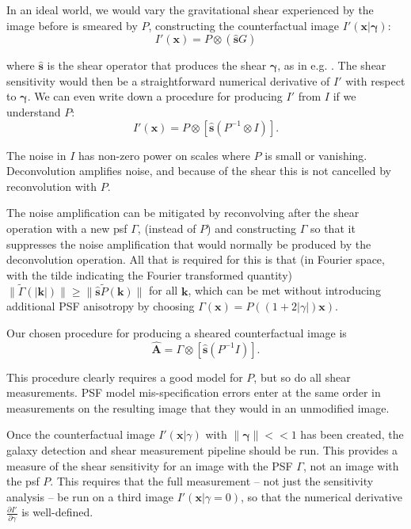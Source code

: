 \documentclass[iop]{emulateapj}
\begin{document}
In an ideal world, we would vary the gravitational shear experienced by the image before is smeared by $P$, constructing the counterfactual image $I'(\mathbf{x}| {\boldsymbol \gamma})$:
\begin{equation}
  I'({\mathbf{x}}) = P \otimes\left( \hat{\mathbf{s}}G\right)
\end{equation}

where $\hat{\mathbf{s}}$ is the shear operator that produces the shear ${\boldsymbol \gamma}$, as in e.g. \cite{2002AJ....123..583B}. The shear sensitivity would then be a straightforward numerical derivative of $I'$ with respect to ${\boldsymbol \gamma}$. We can even write down a procedure for producing $I'$ from $I$ if we understand $P$:
\begin{equation}
  I'({\mathbf{x}}) = P \otimes \left[ \hat{\mathbf{s}}\left( P^{-1} \otimes I \right)\right].
\end{equation}

The noise in $I$ has non-zero power on scales where $P$ is small or vanishing. Deconvolution amplifies noise, and because of the shear this is not cancelled by reconvolution with $P$. 

The noise amplification can be mitigated by reconvolving after the shear operation with a new psf $\Gamma$, (instead of $P$) and constructing $\Gamma$ so that it suppresses the noise amplification that would normally be produced by the deconvolution operation. All that is required for this is that (in Fourier space, with the tilde indicating the Fourier transformed quantity) $\|\tilde{\Gamma}(\mathbf{|k|}) \| \geq \|\hat{\mathbf{s}} \tilde{P}(\mathbf{k})\|$ for all $\mathbf{k}$, which can be met without introducing additional PSF anisotropy by choosing $\Gamma(\mathbf{x}) = P\left((1+2|\gamma|)\mathbf{x}\right)$.

Our chosen procedure for producing a sheared counterfactual image is
\begin{equation}
\hat{\mathbf{A}}  = \Gamma \otimes \left[ \hat{\mathbf{s}} \left(P^{-1} I \right)\right].
\end{equation}

This procedure clearly requires a good model for $P$, but so do all shear measurements. PSF model mis-specification errors enter at the same order in measurements on the resulting image that they would in an unmodified image.

Once the counterfactual image $I'(\mathbf{x}|\gamma)$ with $\|{\boldsymbol \gamma}\| << 1$ has been created, the galaxy detection and  shear measurement pipeline should be run. This provides a measure of the shear sensitivity for an image with the PSF $\Gamma$, not an image with the psf $P$. This requires that the full measurement -- not just the sensitivity analysis -- be run on a third image $I'(\mathbf{x}|\gamma=0)$, so that the numerical derivative $\frac{\partial I'}{\partial \gamma}$ is well-defined. 
\end{document}
